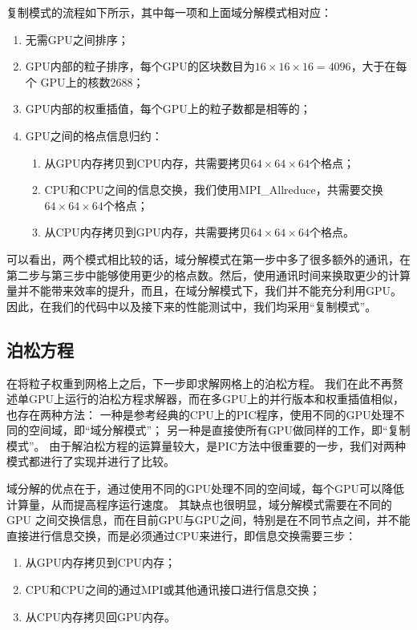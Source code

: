 复制模式的流程如下所示，其中每一项和上面域分解模式相对应：
\begin{enumerate}
  \item 无需GPU之间排序；
  \item GPU内部的粒子排序，每个GPU的区块数目为$16 \times 16 \times 16 = 4096$，大于在每个 GPU上的核数2688；
  \item GPU内部的权重插值，每个GPU上的粒子数都是相等的；
  \item GPU之间的格点信息归约：
  \begin{enumerate}
    \item 从GPU内存拷贝到CPU内存，共需要拷贝$64 \times 64 \times 64$个格点；
    \item CPU和CPU之间的信息交换，我们使用MPI\_Allreduce，共需要交换 $64 \times 64 \times 64$个格点；
    \item 从CPU内存拷贝到GPU内存，共需要拷贝$64 \times 64 \times 64$个格点。
  \end{enumerate}
\end{enumerate}

可以看出，两个模式相比较的话，域分解模式在第一步中多了很多额外的通讯，在第二步与第三步中能够使用更少的格点数。然后，使用通讯时间来换取更少的计算量并不能带来效率的提升，而且，在域分解模式下，我们并不能充分利用GPU。因此，在我们的代码中以及接下来的性能测试中，我们均采用“复制模式”。

\subsection{泊松方程}
\label{section:PIC_GPU_Poisson}
在将粒子权重到网格上之后，下一步即求解网格上的泊松方程。
我们在此不再赘述单GPU上运行的泊松方程求解器，而在多GPU上的并行版本和权重插值相似，也存在两种方法：
一种是参考经典的CPU上的PIC程序，使用不同的GPU处理不同的空间域，即“域分解模式”；
另一种是直接使所有GPU做同样的工作，即“复制模式”。
由于解泊松方程的运算量较大，是PIC方法中很重要的一步，我们对两种模式都进行了实现并进行了比较。

域分解的优点在于，通过使用不同的GPU处理不同的空间域，每个GPU可以降低计算量，从而提高程序运行速度。
其缺点也很明显，域分解模式需要在不同的GPU 之间交换信息，而在目前GPU与GPU之间，特别是在不同节点之间，并不能直接进行信息交换，而是必须通过CPU来进行，即信息交换需要三步：
\begin{enumerate}
  \item 从GPU内存拷贝到CPU内存；
  \item CPU和CPU之间的通过MPI或其他通讯接口进行信息交换；
  \item 从CPU内存拷贝回GPU内存。
\end{enumerate}

